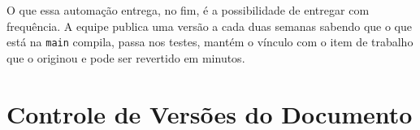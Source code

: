 \documentclass[a4paper,12pt,oneside,openany]{book}
\newif\iforientacoes
\newcommand{\orientacao}[1]{%
    \iforientacoes
        \begin{quote}
        \small\itshape\textbf{Orientação:} #1
        \end{quote}
    \fi
}
\begin{document}
O que essa automação entrega, no fim, é a possibilidade de entregar com
frequência. A equipe publica uma versão a cada duas semanas sabendo que o que
está na \texttt{main} compila, passa nos testes, mantém o vínculo com o item de
trabalho que o originou e pode ser revertido em minutos.


%

%
%

\chapter*{Controle de Versões do Documento}

\orientacao{Registrem apenas alterações significativas nesta documentação.
Este controle se refere ao documento; o versionamento do software deve ser
descrito no capítulo de Gestão de Configuração e Manutenção.}
\end{document}
